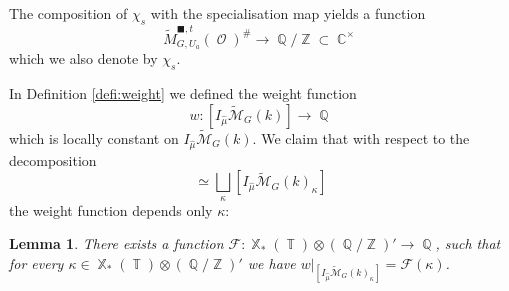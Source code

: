\documentclass{article}
\DeclareMathOperator{\Cb}{\mathbb{C}}
\newcommand{\Ec}{\mathcal{E}}
\DeclareMathOperator{\res}{res}
\DeclareMathOperator{\Zb}{\mathbb{Z}}
\DeclareMathOperator{\Xb}{\mathbb{X}}
\DeclareMathOperator{\Tb}{\mathbb{T}}
\newcommand{\Mc}{\mathcal{M}}
\DeclareMathOperator{\Spec}{\mathsf{Spec}}
\DeclareMathOperator{\Oo}{\mathcal{O}}
\DeclareMathOperator{\Qb}{\mathbb{Q}}
\newcommand{\CF}{{\mathcal F}}
\newcommand{\wpc}{\widetilde{\mathcal{P}} }
\newcommand{\wm}{\widetilde{M} }
\theoremstyle{definition}
\theoremstyle{plain}
\newtheorem{lemma}[definition]{Lemma}
\begin{document}
The composition of $\chi_s$ with the specialisation map yields a function 
$$\widetilde{M}_{G,U_a}^{\blacksquare,t}(\Oo)^\# \to \Qb/\Zb \subset \Cb^{\times}$$ which we also denote by $\chi_s$. 




In Definition \ref{defi:weight} we defined the weight function
$$w\colon [I_{\widehat{\mu}}\widetilde{\Mc}_G(k)] \to \Qb$$
which is locally constant on $I_{\widehat{\mu}}\widetilde{\Mc}_G(k)$. We claim that with respect to the decomposition
\begin{equation*}
  [I_{\widehat{\mu}}\widetilde{\Mc}_G(k)] \simeq \bigsqcup_{\kappa} [I_{\widehat{\mu}}\widetilde{\Mc}_G(k)_\kappa]%
\end{equation*}
the weight function depends only $\kappa$:

\begin{lemma}\label{lemma:shift_constant}
There exists a function $\CF\colon \Xb_*(\Tb) \otimes (\Qb/\Zb)' \to \Qb$, such that for every $\kappa \in \Xb_*(\Tb)\otimes (\Qb/\Zb)'$  we have $w|_{[I_{\widehat{\mu}}\widetilde{\Mc}_G(k)_\kappa]} = \CF(\kappa)$.
\end{lemma}
\end{document}

